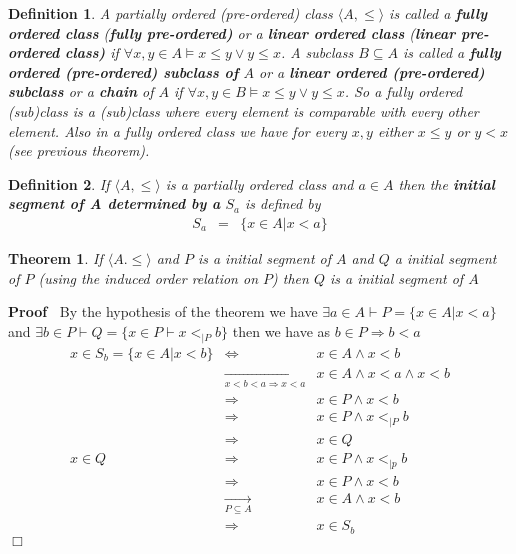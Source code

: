 \documentclass{book}
\newcommand{\Rightarrowlim}{\mathop{\rightarrow}\limits}
\newcommand{\nobracket}{}
\newcommand{\tmtextbf}[1]{{\bfseries{#1}}}
\newenvironment{proof}{\noindent\textbf{Proof\ }}{\hspace*{\fill}$\Box$\medskip}
\newtheorem{definition}{Definition}
{\theorembodyfont{\rmfamily}\newtheorem{example}{Example}}
\newtheorem{theorem}{Theorem}
\begin{document}
{{\begin{definition}
  \label{linear ordered class}{}{}{}{}A partially ordered
  (pre-ordered) class $\langle A, \leqslant \rangle$ is called a
  \tmtextbf{fully ordered class} (\tmtextbf{fully pre-ordered)} or a
  \tmtextbf{linear ordered class} (\tmtextbf{linear pre-ordered class)} if
  $\forall x, y \in A \vDash x \leqslant y \vee y \leqslant x$. A subclass $B
  \subseteq A$ is called a \tmtextbf{fully ordered (pre-ordered) subclass of}
  $A$ or a \tmtextbf{linear ordered (pre-ordered) subclass} or a
  \tmtextbf{chain} of $A$ if $\forall x, y \in B \vDash x \leqslant y \vee y
  \leqslant x$. So a fully ordered (sub)class is a (sub)class where every
  element is comparable with every other element. Also in a fully ordered
  class we have for every $x, y$ either $x \leqslant y$ or $y < x$ (see
  previous theorem).
\end{definition}

\begin{definition}
  \label{initial segment}{}{}If $\langle
  A, \leqslant \rangle$ is a partially ordered class and $a \in A$ then the
  \tmtextbf{initial segment of A determined by a} $S_a$ is defined by
  \begin{eqnarray*}
    S_a & = & \{ x \in A | x < a \nobracket \}
  \end{eqnarray*}
\end{definition}

\begin{theorem}
  If $\langle A. \leqslant \rangle$ and $P$ is a initial segment of $A$ and
  $Q$ a initial segment of $P$ (using the induced order relation on $P$) then
  $Q$ is a initial segment of $A$
\end{theorem}

\begin{proof}
  By the hypothesis of the theorem we have $\exists a \in A \vdash P = \{ x
  \in A | x < a \nobracket \}$ and $\exists b \in P \vdash Q = \{ x \in P
  \vdash x <_{| P \nobracket} b \}$ then we have as $b \in P \Rightarrow b <
  a$
  \begin{eqnarray*}
    x \in S_b = \{ x \in A | x < b \nobracket \} & \Leftrightarrow & x \in A
    \wedge x < b\\
    & \Rightarrowlim_{x < b < a \Rightarrow x < a} & x \in A \wedge x < a
    \wedge x < b\\
    & \Rightarrow & x \in P \wedge x < b\\
    & \Rightarrow & x \in P \wedge x <_{| P \nobracket} b\\
    & \Rightarrow & x \in Q\\
    x \in Q & \Rightarrow & x \in P \wedge x <_{| p \nobracket} b\\
    & \Rightarrow & x \in P \wedge x < b\\
    & \Rightarrowlim_{P \subseteq A} & x \in A \wedge x < b\\
    & \Rightarrow & x \in S_b
  \end{eqnarray*}
\end{proof}

}}
\end{document}

